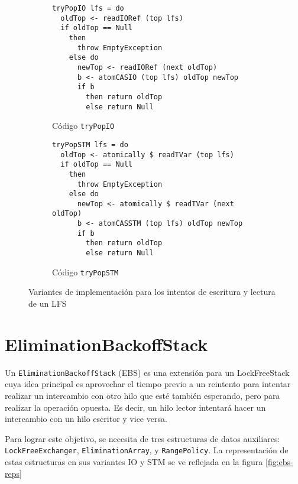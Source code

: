 \begin{figure}[H]
  \begin{subfigure}[b]{0.55\textwidth}
    \begin{verbatim}
tryPopIO lfs = do
  oldTop <- readIORef (top lfs)
  if oldTop == Null
    then
      throw EmptyException
    else do
      newTop <- readIORef (next oldTop)
      b <- atomCASIO (top lfs) oldTop newTop
      if b
        then return oldTop
        else return Null
    \end{verbatim}
    \caption{Código \texttt{tryPopIO}}
  \end{subfigure}
  \begin{subfigure}[b]{0.6\textwidth}
  \begin{verbatim}
tryPopSTM lfs = do
  oldTop <- atomically $ readTVar (top lfs)
  if oldTop == Null
    then
      throw EmptyException
    else do
      newTop <- atomically $ readTVar (next oldTop)
      b <- atomCASSTM (top lfs) oldTop newTop
      if b
        then return oldTop
        else return Null
  \end{verbatim}
  \caption{Código{} \texttt{tryPopSTM}}
  \end{subfigure}
  \caption{Variantes de implementación para los intentos de escritura y lectura de un LFS}
\end{figure}


\clearpage
\section{EliminationBackoffStack}\label{sec:ebs}

Un \texttt{EliminationBackoffStack} (EBS) es una extensión para un LockFreeStack cuya idea principal es aprovechar el tiempo previo a un reintento para intentar realizar un intercambio con otro hilo que esté también esperando, pero para realizar la operación opuesta. Es decir, un hilo lector intentará hacer un intercambio con un hilo escritor y vice versa.

Para lograr este objetivo, se necesita de tres estructuras de datos auxiliares: \texttt{LockFreeExchanger}, \texttt{EliminationArray}, y \texttt{RangePolicy}. La representación de estas estructuras en sus variantes IO y STM se ve reflejada en la figura \ref{fig:ebs-reps}


